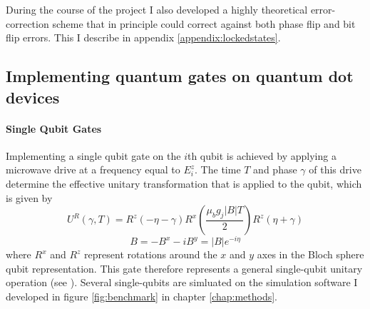 \documentclass{report}
\begin{document}
During the course of the project I also developed a highly theoretical error-correction scheme that in principle could correct against both phase flip and bit flip errors. This I describe in appendix \ref{appendix:lockedstates}.

\begin{appendices}
\chapter{Implementing quantum gates on quantum dot devices} \label{appendix:gates}
\subsubsection{Single Qubit Gates}
Implementing a single qubit gate on the $i$th qubit is achieved by applying a microwave drive at a frequency equal to $E^z_i$. The time $T$ and phase $\gamma$ of this drive determine the effective unitary transformation that is applied to the qubit, which is given by
\begin{equation*}
    U^R(\gamma, T) = R^z(-\eta-\gamma)R^x(\frac{\mu_b g_j |B|T}{2})R^z(\eta+\gamma)
\end{equation*}
\begin{equation*}
    B = -B^x - iB^y = |B|e^{-i\eta}
\end{equation*} where $R^x$ and $R^z$ represent rotations around the $x$ and $y$ axes in the Bloch sphere qubit representation. This gate therefore represents a general single-qubit unitary operation (see \cite{Nielsen2010}). Several single-qubits are simluated on the simulation software I developed in figure \ref{fig:benchmark} in chapter \ref{chap:methods}.

\end{appendices}
\end{document}
